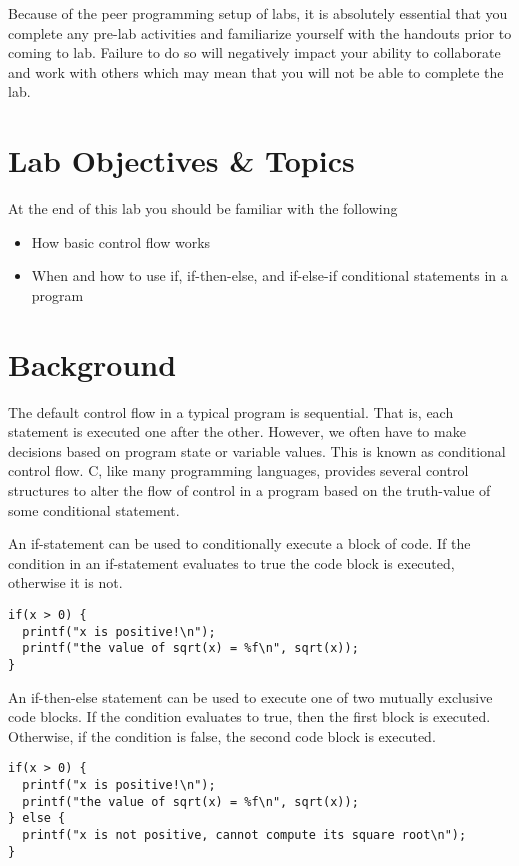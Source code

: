 \documentclass[12pt]{scrartcl}
\begin{document}
Because of the peer programming setup of labs, it is absolutely 
essential that you complete any pre-lab activities and familiarize
yourself with the handouts prior to coming to lab.  Failure to do
so will negatively impact your ability to collaborate and work with 
others which may mean that you will not be able to complete the
lab.  

\section{Lab Objectives \& Topics}
At the end of this lab you should be familiar with the following
\begin{itemize}
  \item How basic control flow works
  \item When and how to use if, if-then-else, and if-else-if conditional 
  	statements in a program
\end{itemize}

\section{Background}

The default control flow in a typical program is sequential.  That is, 
each statement is executed one after the other.  However, we often 
have to make decisions based on program state or variable values.  
This is known as conditional control flow.  C, like many programming 
languages, provides several control structures to alter the flow of 
control in a program based on the truth-value of some conditional 
statement.

An if-statement can be used to conditionally execute a block of code.  
If the condition in an if-statement evaluates to true the code block is 
executed, otherwise it is not.

\begin{verbatim}
if(x > 0) {
  printf("x is positive!\n");
  printf("the value of sqrt(x) = %f\n", sqrt(x));
}
\end{verbatim}

An if-then-else statement can be used to execute one of two mutually 
exclusive code blocks.  If the condition evaluates to true, then the first 
block is executed.  Otherwise, if the condition is false, the second code 
block is executed. 

\begin{verbatim}
if(x > 0) {
  printf("x is positive!\n");
  printf("the value of sqrt(x) = %f\n", sqrt(x));
} else {
  printf("x is not positive, cannot compute its square root\n");
}
\end{verbatim}
\end{document}
